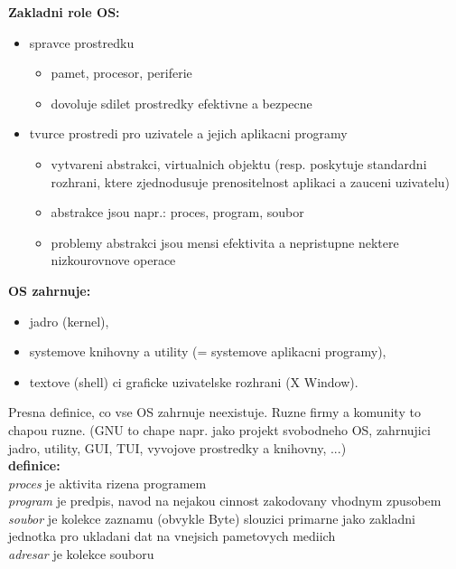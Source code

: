 \documentclass[a4paper, 11pt]{article}
\begin{document}
\noindent\textbf{Zakladni role OS:}
\begin{itemize}
    \item spravce prostredku
        \begin{itemize}
            \item pamet, procesor, periferie
             \item dovoluje sdilet prostredky efektivne a bezpecne
        \end{itemize}
    \item tvurce prostredi pro uzivatele a jejich aplikacni programy
        \begin{itemize}
            \item vytvareni abstrakci, virtualnich objektu (resp. poskytuje standardni rozhrani, ktere zjednodusuje prenositelnost aplikaci a zauceni uzivatelu)
            \item abstrakce jsou napr.: proces, program, soubor
            \item problemy abstrakci jsou mensi efektivita a nepristupne nektere nizkourovnove operace \\
        \end{itemize}
\end{itemize}

\noindent\textbf{OS zahrnuje:}
\begin{itemize}
    \item jadro (kernel),
    \item systemove knihovny a utility (= systemove aplikacni programy),
    \item textove (shell) ci graficke uzivatelske rozhrani (X Window). \\
\end{itemize}

\noindent Presna definice, co vse OS zahrnuje neexistuje. Ruzne firmy a komunity to chapou ruzne. (GNU to chape napr. jako projekt svobodneho OS, zahrnujici jadro, utility, GUI, TUI, vyvojove prostredky a knihovny, ...) \\[1em]

\noindent\textbf{definice:} \\[0.5em] \label{procesy} \label{soubory}
\textit{proces} je aktivita rizena programem \\[0.2em]
\textit{program} je predpis, navod na nejakou cinnost zakodovany vhodnym zpusobem \\[0.2em]
\textit{soubor} je kolekce zaznamu (obvykle Byte) slouzici primarne jako zakladni jednotka pro ukladani dat na vnejsich pametovych mediich \\[0.2em]
\textit{adresar} je kolekce souboru
\end{document}
